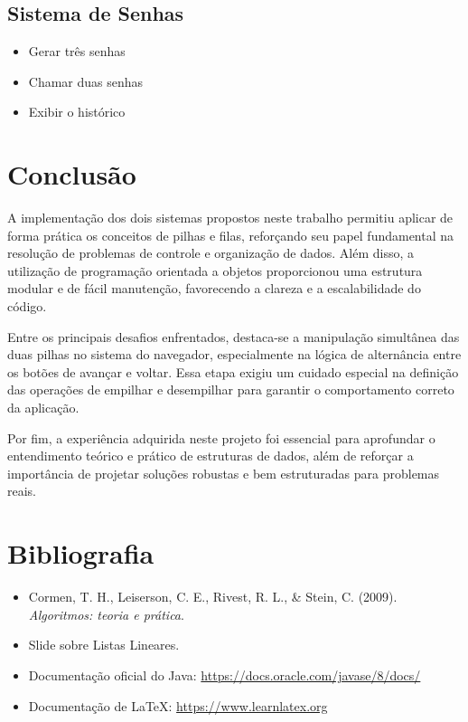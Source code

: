 \documentclass[12pt]{article}
\begin{document}
\subsection*{Sistema de Senhas}
\begin{itemize}
    \item Gerar três senhas
    \item Chamar duas senhas
    \item Exibir o histórico
\end{itemize}

\section{Conclusão}

A implementação dos dois sistemas propostos neste trabalho permitiu aplicar de forma prática os conceitos de pilhas e filas, reforçando seu papel fundamental na resolução de problemas de controle e organização de dados. Além disso, a utilização de programação orientada a objetos proporcionou uma estrutura modular e de fácil manutenção, favorecendo a clareza e a escalabilidade do código.

Entre os principais desafios enfrentados, destaca-se a manipulação simultânea das duas pilhas no sistema do navegador, especialmente na lógica de alternância entre os botões de avançar e voltar. Essa etapa exigiu um cuidado especial na definição das operações de empilhar e desempilhar para garantir o comportamento correto da aplicação.

Por fim, a experiência adquirida neste projeto foi essencial para aprofundar o entendimento teórico e prático de estruturas de dados, além de reforçar a importância de projetar soluções robustas e bem estruturadas para problemas reais.



\section{Bibliografia}
\begin{itemize}
    \item Cormen, T. H., Leiserson, C. E., Rivest, R. L., \& Stein, C. (2009). \textit{Algoritmos: teoria e prática}.
    \item Slide sobre Listas Lineares.
     \item Documentação oficial do Java: \url{https://docs.oracle.com/javase/8/docs/}
    \item Documentação de LaTeX: \url{https://www.learnlatex.org}
\end{itemize}
\end{document}
